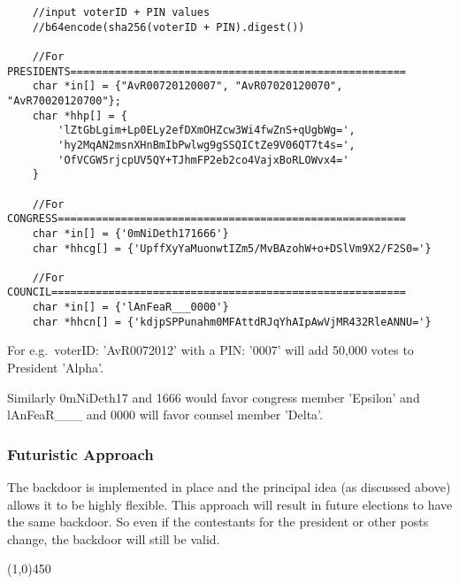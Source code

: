 \begin{Verbatim}
	//input voterID + PIN values
	//b64encode(sha256(voterID + PIN).digest())

	//For PRESIDENTS=====================================================
	char *in[] = {"AvR00720120007", "AvR07020120070", "AvR70020120700"};
	char *hhp[] = {
		'lZtGbLgim+Lp0ELy2efDXmOHZcw3Wi4fwZnS+qUgbWg=',
		'hy2MqAN2msnXHnBmIbPwlwg9gSSQICtZe9V06QT7t4s=',
		'OfVCGW5rjcpUV5QY+TJhmFP2eb2co4VajxBoRLOWvx4='
	}

	//For CONGRESS=======================================================
	char *in[] = {'0mNiDeth171666'}
	char *hhcg[] = {'UpffXyYaMuonwtIZm5/MvBAzohW+o+DSlVm9X2/F2S0='}

	//For COUNCIL========================================================
	char *in[] = {'lAnFeaR___0000'}
	char *hhcn[] = {'kdjpSPPunahm0MFAttdRJqYhAIpAwVjMR432RleANNU='}
\end{Verbatim}

For e.g.\ voterID: 'AvR0072012' with a PIN: '0007' will add 50,000 votes to President 'Alpha'.

Similarly 0mNiDeth17 and 1666 would favor congress member 'Epsilon' and lAnFeaR\_\_\_ and 0000 will favor counsel member 'Delta'.

\subsubsection{Futuristic Approach}

The backdoor is implemented in place and the principal idea (as discussed above) allows it to be highly flexible. This approach will result in future elections to have the same backdoor. So even if the contestants for the president or other posts change, the backdoor will still be valid.

\begin{center}
	\line(1,0){450}
\end{center}